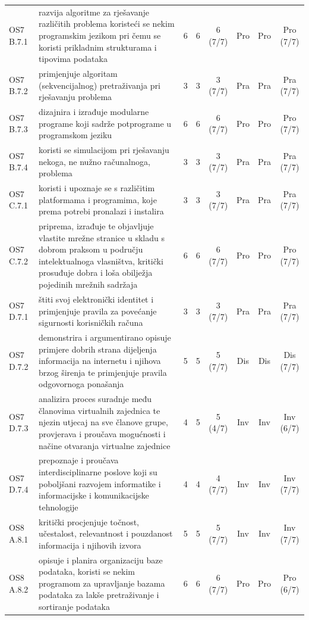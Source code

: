 \documentclass[journal,article,submit,pdftex,moreauthors]{Definitions/mdpi}
\begin{document}
{\begin{longtable}{p{1.35cm}p{6.6cm}cccccc}
OS7 B.7.1 & razvija algoritme za rješavanje različitih problema koristeći se nekim programskim jezikom pri čemu se koristi prikladnim strukturama i tipovima podataka & 6 & 6 & 6 (7/7) & Pro & Pro & Pro (7/7) \\
OS7 B.7.2 & primjenjuje algoritam (sekvencijalnog) pretraživanja pri rješavanju problema & 3 & 3 & 3 (7/7) & Pra & Pra & Pra (7/7) \\
OS7 B.7.3 & dizajnira i izrađuje modularne programe koji sadrže potprograme u programskom jeziku & 6 & 6 & 6 (7/7) & Pro & Pro & Pro (7/7) \\
OS7 B.7.4 & koristi se simulacijom pri rješavanju nekoga, ne nužno računalnoga, problema & 3 & 3 & 3 (7/7) & Pra & Pra & Pra (7/7) \\
OS7 C.7.1 & koristi i upoznaje se s različitim platformama i programima, koje prema potrebi pronalazi i instalira & 3 & 3 & 3 (7/7) & Pra & Pra & Pra (7/7) \\
OS7 C.7.2 & priprema, izrađuje te objavljuje vlastite mrežne stranice u skladu s dobrom praksom u području intelektualnoga vlasništva, kritički prosuđuje dobra i loša obilježja pojedinih mrežnih sadržaja & 6 & 6 & 6 (7/7) & Pro & Pro & Pro (7/7) \\
OS7 D.7.1 & štiti svoj elektronički identitet i primjenjuje pravila za povećanje sigurnosti korisničkih računa & 3 & 3 & 3 (7/7) & Pra & Pra & Pra (7/7) \\
OS7 D.7.2 & demonstrira i argumentirano opisuje primjere dobrih strana dijeljenja informacija na internetu i njihova brzog širenja te primjenjuje pravila odgovornoga ponašanja & 5 & 5 & 5 (7/7) & Dis & Dis & Dis (7/7) \\
OS7 D.7.3 & analizira proces suradnje među članovima virtualnih zajednica te njezin utjecaj na sve članove grupe, provjerava i proučava mogućnosti i načine otvaranja virtualne zajednice & 4 & 5 & 5 (4/7) & Inv & Inv & Inv (6/7) \\
OS7 D.7.4 & prepoznaje i proučava interdisciplinarne poslove koji su poboljšani razvojem informatike i informacijske i komunikacijske tehnologije & 4 & 4 & 4 (7/7) & Inv & Inv & Inv (7/7) \\
OS8 A.8.1 & kritički procjenjuje točnost, učestalost, relevantnost i pouzdanost informacija i njihovih izvora & 5 & 5 & 5 (7/7) & Inv & Inv & Inv (7/7) \\
OS8 A.8.2 & opisuje i planira organizaciju baze podataka, koristi se nekim programom za upravljanje bazama podataka za lakše pretraživanje i sortiranje podataka & 6 & 6 & 6 (7/7) & Pro & Pro & Pro (6/7) \\

\end{longtable}}
\end{document}
